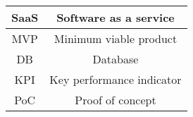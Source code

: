\begin{tabular}{| c | c |}
    \hline
    SaaS & Software as a service \\
    \hline
    MVP & Minimum viable product \\
    \hline
    DB & Database \\ 
    \hline
    KPI & Key performance indicator \\
    \hline
    PoC & Proof of concept \\
    \hline
\end{tabular}
